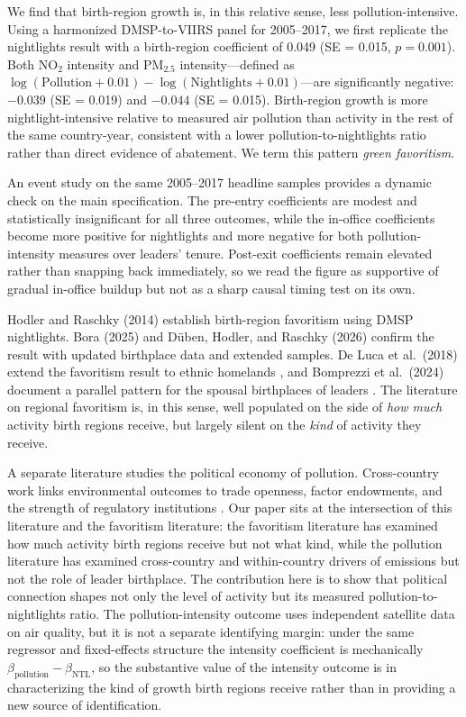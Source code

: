 \documentclass[9pt,twocolumn,twoside]{pnas-new}
\begin{document}
We find that birth-region growth is, in this relative sense, less pollution-intensive. Using a harmonized DMSP-to-VIIRS panel for 2005--2017, we first replicate the nightlights result with a birth-region coefficient of 0.049 (SE = 0.015, $p = 0.001$). Both NO$_2$ intensity and PM$_{2.5}$ intensity---defined as $\log(\text{Pollution}+0.01) - \log(\text{Nightlights}+0.01)$---are significantly negative: $-0.039$ (SE = 0.019) and $-0.044$ (SE = 0.015). Birth-region growth is more nightlight-intensive relative to measured air pollution than activity in the rest of the same country-year, consistent with a lower pollution-to-nightlights ratio rather than direct evidence of abatement. We term this pattern \emph{green favoritism}.

An event study on the same 2005--2017 headline samples provides a dynamic check on the main specification. The pre-entry coefficients are modest and statistically insignificant for all three outcomes, while the in-office coefficients become more positive for nightlights and more negative for both pollution-intensity measures over leaders' tenure. Post-exit coefficients remain elevated rather than snapping back immediately, so we read the figure as supportive of gradual in-office buildup but not as a sharp causal timing test on its own.

Hodler and Raschky (2014) establish birth-region favoritism using DMSP nightlights. Bora (2025) and D\"{u}ben, Hodler, and Raschky (2026) confirm the result with updated birthplace data and extended samples. De Luca et al.\ (2018) extend the favoritism result to ethnic homelands \cite{DeLuca2018}, and Bomprezzi et al.\ (2024) document a parallel pattern for the spousal birthplaces of leaders \cite{Bomprezzi2024Spouses}. The literature on regional favoritism is, in this sense, well populated on the side of \emph{how much} activity birth regions receive, but largely silent on the \emph{kind} of activity they receive.

A separate literature studies the political economy of pollution. Cross-country work links environmental outcomes to trade openness, factor endowments, and the strength of regulatory institutions \cite{CopelandTaylor2004}. Our paper sits at the intersection of this literature and the favoritism literature: the favoritism literature has examined how much activity birth regions receive but not what kind, while the pollution literature has examined cross-country and within-country drivers of emissions but not the role of leader birthplace. The contribution here is to show that political connection shapes not only the level of activity but its measured pollution-to-nightlights ratio. The pollution-intensity outcome uses independent satellite data on air quality, but it is not a separate identifying margin: under the same regressor and fixed-effects structure the intensity coefficient is mechanically $\beta_{\text{pollution}} - \beta_{\text{NTL}}$, so the substantive value of the intensity outcome is in characterizing the kind of growth birth regions receive rather than in providing a new source of identification.
\end{document}
